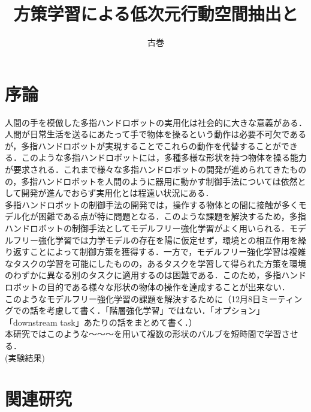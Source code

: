 \documentclass[dvipdfmx]{ampbt_nomag}
\title{方策学習による低次元行動空間抽出と
}     %
      {実環境における物体操り動作獲得}                             %
      {}                                              %
\author{古巻}{鉄平}             %
\begin{document}
\ifoutputbody
\makeinsidecover                %
\makeabstract                   %
\maketoc                        %
\setcounter{page}{1}            %
\section{序論}\label{sec-intro}		%
人間の手を模倣した多指ハンドロボットの実用化は社会的に大きな意義がある．人間が日常生活を送るにあたって手で物体を操るという動作は必要不可欠であるが，多指ハンドロボットが実現することでこれらの動作を代替することができる．このような多指ハンドロボットには，多種多様な形状を持つ物体を操る能力が要求される．これまで様々な多指ハンドロボットの開発が進められてきたものの，多指ハンドロボットを人間のように器用に動かす制御手法については依然として開発が進んでおらず実用化とは程遠い状況にある．\\
多指ハンドロボットの制御手法の開発では，操作する物体との間に接触が多くモデル化が困難である点が特に問題となる．このような課題を解決するため，多指ハンドロボットの制御手法としてモデルフリー強化学習がよく用いられる．モデルフリー強化学習では力学モデルの存在を陽に仮定せず，環境との相互作用を繰り返すことによって制御方策を獲得する\cite{RLBook}．一方で，モデルフリー強化学習は複雑なタスクの学習を可能にしたものの，あるタスクを学習して得られた方策を環境のわずかに異なる別のタスクに適用するのは困難である\cite{hua2021learning}．このため，多指ハンドロボットの目的である様々な形状の物体の操作を達成することが出来ない．\\
このようなモデルフリー強化学習の課題を解決するために（12月8日ミーティングでの話を考慮して書く．「階層強化学習」ではない．「オプション」「downstream task」あたりの話をまとめて書く．）
\\
本研究ではこのような〜〜〜を用いて複数の形状のバルブを短時間で学習させる．\\
(実験結果)\\


\section{関連研究}\label{sec-related_papers}
\end{document}
